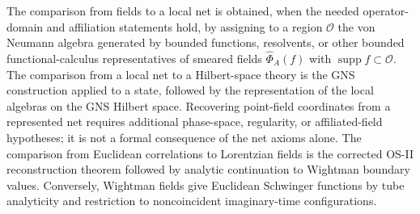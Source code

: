 The comparison from fields to a local net is obtained, when the needed
operator-domain and affiliation statements hold, by assigning to a region
\(\mathcal O\) the von Neumann algebra generated by bounded functions,
resolvents, or other bounded functional-calculus representatives of smeared
fields \(\widehat\Phi_A(f)\) with \(\operatorname{supp}f\subset\mathcal O\).  The
comparison from a local net to a Hilbert-space theory is the GNS construction
applied to a state, followed by the representation of the local algebras on
the GNS Hilbert space.  Recovering point-field coordinates from a represented
net requires additional phase-space, regularity, or affiliated-field
hypotheses; it is not a formal consequence of the net axioms alone.  The
comparison from Euclidean correlations to Lorentzian fields is the corrected
OS-II reconstruction theorem followed by analytic continuation to Wightman
boundary values.  Conversely, Wightman fields give Euclidean Schwinger
functions by tube analyticity and restriction to noncoincident imaginary-time
configurations.

